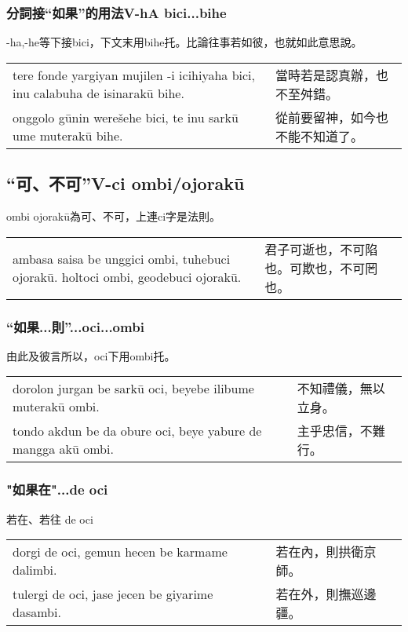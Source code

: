 \documentclass{article}
\begin{document}
\subsubsection{分詞接“如果”的用法V-hA bici...bihe}
\noindent -ha,-he等下接bici，下文末用bihe托。比論往事若如彼，也就如此意思說。
\begin{center}
    \begin{tabularx}{\textwidth}{XX}
     tere fonde yargiyan mujilen -i icihiyaha bici, inu calabuha de isinarak\={u} bihe. &當時若是認真辦，也不至舛錯。\\
     onggolo g\={u}nin were\v{s}ehe bici, te inu sark\={u} ume muterak\={u} bihe. &從前要留神，如今也不能不知道了。
    \end{tabularx}
\end{center}

\subsection{“可、不可”V-ci ombi/ojorak\={u}}
\noindent ombi ojorak\={u}為可、不可，上連ci字是法則。
\begin{center}
    \begin{tabularx}{\textwidth}{XX}
     ambasa saisa be unggici ombi, tuhebuci ojorak\={u}. holtoci ombi, geodebuci ojorak\={u}. &君子可逝也，不可陷也。可欺也，不可罔也。
    \end{tabularx}
\end{center}

\subsubsection{“如果...則”...oci...ombi}
\noindent 由此及彼言所以，oci下用ombi托。
\begin{center}
    \begin{tabularx}{\textwidth}{XX}
     dorolon jurgan be sark\={u} oci, beyebe ilibume muterak\={u} ombi. &不知禮儀，無以立身。\\
     tondo akdun be da obure oci, beye yabure de mangga ak\={u} ombi. &主乎忠信，不難行。
    \end{tabularx}
\end{center}

\subsubsection{"如果在"...de oci}
\noindent 若在、若往 de oci
\begin{center}
    \begin{tabularx}{\textwidth}{XX}
     dorgi de oci, gemun hecen be karmame dalimbi. &若在內，則拱衛京師。\\
     tulergi de oci, jase jecen be giyarime dasambi. &若在外，則撫巡邊疆。
    \end{tabularx}
\end{center}
\end{document}
